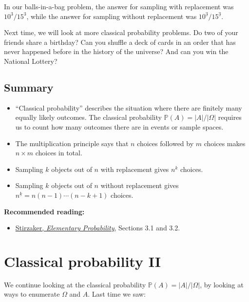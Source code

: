 \documentclass[
  a4paper,
]{book}
\providecommand{\tightlist}{%
  \setlength{\itemsep}{0pt}\setlength{\parskip}{0pt}}
\theoremstyle{definition}
\theoremstyle{definition}
\theoremstyle{definition}
\theoremstyle{definition}
\theoremstyle{remark}
\begin{document}
In our balls-in-a-bag problem, the answer for sampling with replacement was \(10^3/15^3\), while the answer for sampling without replacement was \({10}^{\underline{3}}/{15}^{\underline{3}}\).

Next time, we will look at more classical probability problems. Do two of your friends share a birthday? Can you shuffle a deck of cards in an order that has never happened before in the history of the universe? And can you win the National Lottery?

\hypertarget{summary-L05}{%
\section*{Summary}\label{summary-L05}}

\begin{itemize}
\tightlist
\item
  ``Classical probability'' describes the situation where there are finitely many equally likely outcomes. The classical probability \(\mathbb P(A) = |A|/|\Omega|\) requires us to count how many outcomes there are in events or sample spaces.
\item
  The multiplication principle says that \(n\) choices followed by \(m\) choices makes \(n \times m\) choices in total.
\item
  Sampling \(k\) objects out of \(n\) with replacement gives \(n^k\) choices.
\item
  Sampling \(k\) objects out of \(n\) without replacement gives \(n^{\underline{k}} = n(n-1)\cdots(n-k+1)\) choices.
\end{itemize}

\textbf{Recommended reading:}

\begin{itemize}
\tightlist
\item
  \href{https://leeds.primo.exlibrisgroup.com/permalink/44LEE_INST/13rlbcs/alma991013131349705181}{Stirzaker, \emph{Elementary Probability}}, Sections 3.1 and 3.2.
\end{itemize}

\hypertarget{L06-classical-ii}{%
\chapter{Classical probability II}\label{L06-classical-ii}}

We continue looking at the classical probability \(\mathbb P(A) = |A|/|\Omega|\), by looking at ways to enumerate \(\Omega\) and \(A\). Last time we saw:
\end{document}
